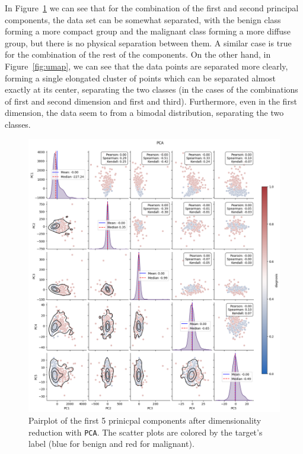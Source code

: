 \documentclass[12pt]{article}
\begin{document}
In Figure~\ref{fig:pca} we can see that for the combination of the first and
second principal components, the data set can be somewhat separated, with the
benign class forming a more compact group and the malignant class forming a more
diffuse group, but there is no physical separation between them. A similar
case is true for the combination of the rest of the components. On the other
hand, in Figure~\ref{fig:umap}, we can see that the data points are separated
more clearly, forming a single elongated cluster of points which can be
separated almost exactly at its center, separating the two classes (in the
cases of the combinations of first and second dimension and first and third).
Furthermore, even in the first dimension, the data seem to from a bimodal
distribution, separating the two classes.

\begin{figure}[H]
    \centering
    \includegraphics[width=\textwidth]{ims/pca.png}
    \caption{Pairplot of the first 5 prinicpal components after dimensionality
    reduction with \texttt{PCA}. The scatter plots are colored by the target's
    label (blue for benign and red for malignant).}
    \label{fig:pca}
\end{figure}
\end{document}
